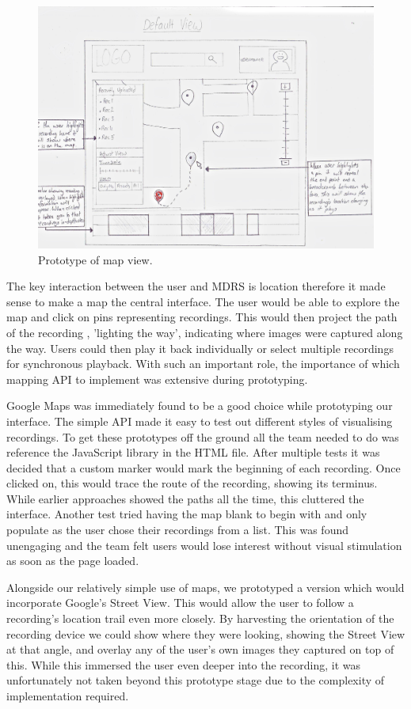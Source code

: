 \documentclass{l3proj}
\begin{document}
\begin{figure}[ht!]
\centering
\includegraphics[width=1\textwidth]{images/web-map-view.jpg}
\caption{Prototype of map view.}
\end{figure}

The key interaction between the user and MDRS is location therefore it made sense to make a map the central interface. The user would be able to explore the map and click on pins representing recordings. This would then project the path of the recording , 'lighting the way', indicating where images were captured along the way. Users could then play it back individually or select multiple recordings for synchronous playback. With such an important role, the importance of which mapping API to implement was extensive during prototyping.

Google Maps was immediately found to be a good choice while prototyping our interface. The simple API made it easy to test out different styles of visualising recordings. To get these prototypes off the ground all the team needed to do was  reference the JavaScript library in the HTML file. After multiple tests it was decided that a custom marker would mark the beginning of each recording. Once clicked on, this would trace the route of the recording, showing its terminus. While earlier approaches showed the paths all the time, this cluttered the interface. Another test tried having the map blank to begin with and only populate as the user chose their recordings from a list. This was found unengaging and the team felt users would lose interest without visual stimulation as soon as the page loaded.

Alongside our relatively simple use of maps, we prototyped a version which would incorporate Google's Street View. This would allow the user to follow a recording's location trail even more closely. By harvesting the orientation of the recording device we could show where they were looking, showing the Street View at that angle, and overlay any of the user's own images they captured on top of this. While this immersed the user even deeper into the recording, it was unfortunately not taken beyond this prototype stage due to the complexity of implementation required.
\end{document}
